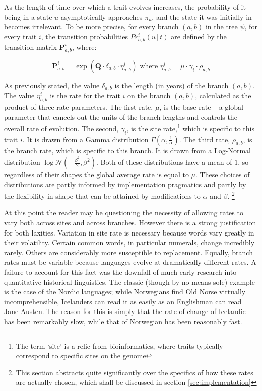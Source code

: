 \documentclass[10pt,journal,compsoc]{IEEEtran}
\begin{document}
As the length of time over which a trait evolves increases, the probability of it being in a state $u$ asymptotically approaches $\pi_u$, and the state it was initially in becomes irrelevant. To be more precise, for every branch $(a, b)$ in the tree $\psi$, for every trait $i$, the transition probabilities $Pr^i_{a,b}\left(u\,\vert\,t\right)$ are defined by the transition matrix $\textbf{P}^i_{a,b}$, where:

\begin{equation}\label{eqn:rate}
\textbf{P}^i_{a,b} = \exp\left(\textbf{Q} \cdot \delta_{a,b} \cdot \eta^i_{a,b}\right) \text{  \ where  \  } \eta^i_{a,b} = \mu \cdot \gamma_i \cdot \rho_{a,b}
\end{equation}

As previously stated, the value $\delta_{a,b}$ is the length (in years) of the branch $(a, b)$. The value $\eta^i_{a,b}$ is the rate for the trait $i$ on the branch $(a, b)$, calculated as the product of three rate parameters. The first rate,  $\mu$, is the base rate -- a global parameter that cancels out the units of the branch lengths and controls the overall rate of evolution. The second, $\gamma_i$, is the site rate,\footnote{The term `site' is a relic from bioinformatics, where traits typically correspond to specific sites on the genome} which is specific to this trait $i$. It is drawn from a Gamma distribution $\Gamma(\alpha, \frac{1}{\alpha})$. The third rate, $\rho_{a,b}$, is the branch rate, which is specific to this branch. It is drawn from a Log-Normal distribution $\log \mathcal{N}(-\frac{\beta^2}{2}, \beta^2)$. Both of these distributions have a mean of $1$, so regardless of their shapes the global average rate is equal to $\mu$. These choices of distributions are partly informed by implementation pragmatics and partly by the flexibility in shape that can be attained by modifications to $\alpha$ and $\beta$. \footnote{This section abstracts quite significantly over the specifics of how these rates are actually chosen, which shall be discussed in section \ref{sec:implementation}}

At this point the reader may be questioning the necessity of allowing rates to vary both across sites and across branches. However there is a strong justification for both laxities. Variation in site rate is necessary because words vary greatly in their volatility. Certain common words, in particular numerals, change incredibly rarely\cite{pagel2018deep}. Others are considerably more susceptible to replacement. Equally, branch rates must be variable because languages evolve at dramatically different rates. A failure to account for this fact was the downfall of much early research into quantitative historical linguistics. The classic (though by no means sole) example is the case of the Nordic languages; while Norwegians find Old Norse virtually incomprehensible, Icelanders can read it as easily as an Englishman can read Jane Austen. The reason for this is simply that the rate of change of Icelandic has been remarkably slow, while that of Norwegian has been reasonably fast\cite{bergsland1962validity}.
\end{document}
